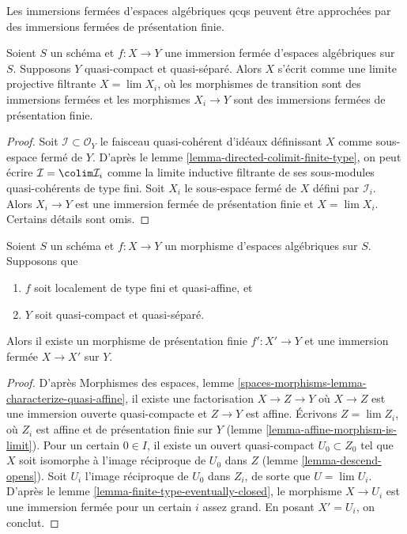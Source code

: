 \begin{lemma}
\label{lemma-closed-is-limit-closed-and-finite-presentation}
\begin{slogan}
Les immersions fermées d'espaces algébriques qcqs peuvent être approchées
par des immersions fermées de présentation finie.
\end{slogan}
Soient $S$ un schéma et $f : X \to Y$ une immersion fermée d'espaces
algébriques sur $S$. Supposons $Y$ quasi-compact et quasi-séparé.
Alors $X$ s'écrit comme une limite projective filtrante $X = \lim X_i$,
où les morphismes de transition sont des immersions fermées et les morphismes
$X_i \to Y$ sont des immersions fermées de présentation finie.
\end{lemma}

\begin{proof}
Soit $\mathcal{I} \subset \mathcal{O}_Y$ le faisceau quasi-cohérent
d'idéaux définissant $X$ comme sous-espace fermé de $Y$. D'après le
lemme \ref{lemma-directed-colimit-finite-type},
on peut écrire $\mathcal{I} = \colim \mathcal{I}_i$ comme la
limite inductive filtrante de ses sous-modules quasi-cohérents de type fini.
Soit $X_i$ le sous-espace fermé de $X$ défini par $\mathcal{I}_i$.
Alors $X_i \to Y$ est une immersion fermée de présentation finie
et $X = \lim X_i$. Certains détails sont omis.
\end{proof}

\begin{lemma}
\label{lemma-quasi-affine-closed-in-finite-presentation}
Soient $S$ un schéma et $f : X \to Y$ un morphisme d'espaces algébriques
sur $S$. Supposons que
\begin{enumerate}
\item $f$ soit localement de type fini et quasi-affine, et
\item $Y$ soit quasi-compact et quasi-séparé.
\end{enumerate}
Alors il existe un morphisme de présentation finie
$f' : X' \to Y$ et une immersion fermée $X \to X'$ sur $Y$.
\end{lemma}

\begin{proof}
D'après Morphismes des espaces, lemme
\ref{spaces-morphisms-lemma-characterize-quasi-affine},
il existe une factorisation $X \to Z \to Y$ où
$X \to Z$ est une immersion ouverte quasi-compacte et
$Z \to Y$ est affine. Écrivons $Z = \lim Z_i$, où $Z_i$ est affine et
de présentation finie sur $Y$ (lemme \ref{lemma-affine-morphism-is-limit}).
Pour un certain $0 \in I$, il existe un ouvert quasi-compact $U_0 \subset Z_0$
tel que $X$ soit isomorphe à l'image réciproque de $U_0$ dans $Z$
(lemme \ref{lemma-descend-opens}). Soit $U_i$ l'image réciproque de
$U_0$ dans $Z_i$, de sorte que $U = \lim U_i$. D'après le
lemme \ref{lemma-finite-type-eventually-closed},
le morphisme $X \to U_i$ est une immersion fermée pour un certain $i$ assez grand.
En posant $X' = U_i$, on conclut.
\end{proof}

